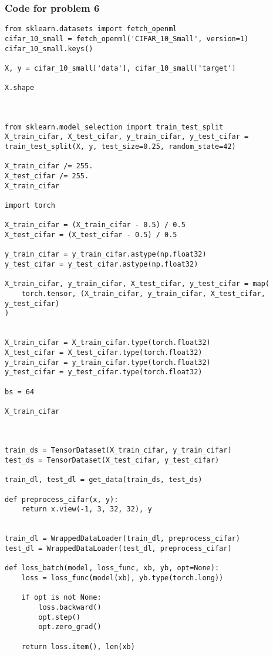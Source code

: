 \documentclass[12pt]{article}%
\begin{document}
\subsubsection*{Code for problem 6}
\begin{lstlisting}
from sklearn.datasets import fetch_openml
cifar_10_small = fetch_openml('CIFAR_10_Small', version=1)
cifar_10_small.keys()

X, y = cifar_10_small['data'], cifar_10_small['target']

X.shape



from sklearn.model_selection import train_test_split
X_train_cifar, X_test_cifar, y_train_cifar, y_test_cifar = train_test_split(X, y, test_size=0.25, random_state=42)

X_train_cifar /= 255.
X_test_cifar /= 255.
X_train_cifar

import torch

X_train_cifar = (X_train_cifar - 0.5) / 0.5
X_test_cifar = (X_test_cifar - 0.5) / 0.5

y_train_cifar = y_train_cifar.astype(np.float32)
y_test_cifar = y_test_cifar.astype(np.float32)

X_train_cifar, y_train_cifar, X_test_cifar, y_test_cifar = map(
    torch.tensor, (X_train_cifar, y_train_cifar, X_test_cifar, y_test_cifar)
)


X_train_cifar = X_train_cifar.type(torch.float32)
X_test_cifar = X_test_cifar.type(torch.float32)
y_train_cifar = y_train_cifar.type(torch.float32)
y_test_cifar = y_test_cifar.type(torch.float32)

bs = 64

X_train_cifar



train_ds = TensorDataset(X_train_cifar, y_train_cifar)
test_ds = TensorDataset(X_test_cifar, y_test_cifar)

train_dl, test_dl = get_data(train_ds, test_ds)

def preprocess_cifar(x, y):
    return x.view(-1, 3, 32, 32), y


train_dl = WrappedDataLoader(train_dl, preprocess_cifar)
test_dl = WrappedDataLoader(test_dl, preprocess_cifar)

def loss_batch(model, loss_func, xb, yb, opt=None):
    loss = loss_func(model(xb), yb.type(torch.long))

    if opt is not None:
        loss.backward()
        opt.step()
        opt.zero_grad()

    return loss.item(), len(xb)




\end{lstlisting}
\end{document}

